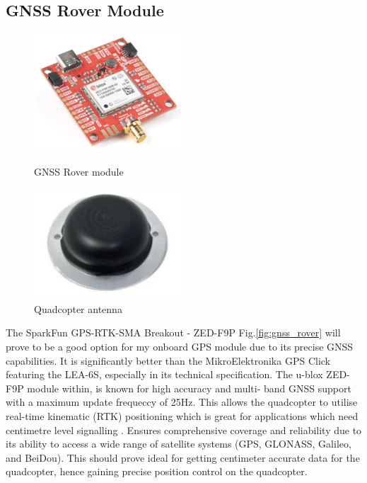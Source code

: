 \documentclass{report}
\begin{document}
\subsection{GNSS Rover Module}
  \begin{figure}[H]
    \begin{minipage}{0.5\textwidth}
      \centering
      \includegraphics[width=0.5\textwidth]{Pictures/gnss_rover.png}
      \caption{GNSS Rover module}
      \label{fig:gnss_rover}
    \end{minipage}
    \begin{minipage}{0.5\textwidth}
      \centering
      \includegraphics[width=0.5\textwidth]{Pictures/quad_antenna.png}
      \caption{Quadcopter antenna}
      \label{fig:Quadcopter antenna}
  \end{minipage}
\end{figure}
The SparkFun GPS-RTK-SMA Breakout - ZED-F9P Fig.\ref{fig:gnss_rover} will prove
to be a good option for my onboard GPS module due to its precise GNSS
capabilities. It is significantly better than the MikroElektronika GPS Click
featuring the LEA-6S, especially in its technical specification. The u-blox
ZED-F9P module within, is known for high accuracy and multi- band GNSS support
with a maximum update frequeccy of 25Hz. This allows the quadcopter to utilise
real-time kinematic (RTK) positioning which is great for applications which need
centimetre level signalling \cite{sbg_systems_2024}. Ensures comprehensive
coverage and reliability due to its ability to access a wide range of satellite
systems (GPS, GLONASS, Galileo, and BeiDou). This should prove ideal for getting
centimeter accurate data for the quadcopter, hence gaining precise position
control on the quadcopter.
\end{document}
